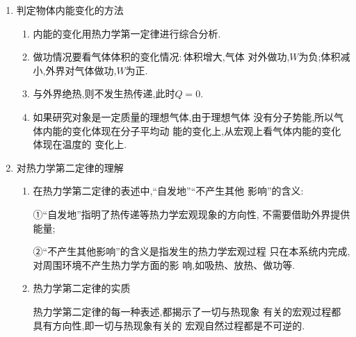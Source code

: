 
\begin{enumerate}
\renewcommand{\labelenumi}{\arabic{enumi}.}
\item
判定物体内能变化的方法
\begin{enumerate}
\renewcommand{\labelenumii}{(\arabic{enumii})}

\item 
内能的变化用热力学第一定律进行综合分析.

\item 
做功情况要看气体体积的变化情况$ : $体积增大,气体
对外做功,$ W $为负;体积减小,外界对气体做功,$ W $为正.

\item 
与外界绝热,则不发生热传递,此时$ Q=0 $.

\item 
如果研究对象是一定质量的理想气体,由于理想气体
没有分子势能,所以气体内能的变化体现在分子平均动
能的变化上,从宏观上看气体内能的变化体现在温度的
变化上.

\end{enumerate}


\item
对热力学第二定律的理解
\begin{enumerate}
\renewcommand{\labelenumii}{(\arabic{enumii})}

\item 
在热力学第二定律的表述中,“自发地”“不产生其他
影响”的含义$ : $

①“自发地”指明了热传递等热力学宏观现象的方向性,
不需要借助外界提供能量;

②“不产生其他影响”的含义是指发生的热力学宏观过程
只在本系统内完成,对周围环境不产生热力学方面的影
响,如吸热、放热、做功等.

\item 
热力学第二定律的实质

热力学第二定律的每一种表述,都揭示了一切与热现象
有关的宏观过程都具有方向性,即一切与热现象有关的
宏观自然过程都是不可逆的.

\end{enumerate}




\end{enumerate}










